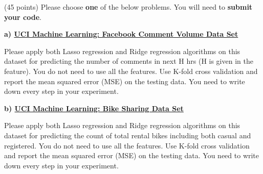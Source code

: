 \documentclass{exam}
\begin{document}
\begin{questions}
\newpage
{} (45 points) Please choose \textbf{one} of the below problems. You will need to \textbf{submit your code}.

{\bf a) \href{https://archive.ics.uci.edu/ml/datasets/Facebook+Comment+Volume+Dataset}{UCI Machine Learning: Facebook Comment Volume Data Set }}

Please apply both Lasso regression and Ridge regression algorithms on this dataset for predicting the number of comments in next H hrs (H is given in the feature).  You do not need to use all the features. Use K-fold cross validation and report the mean squared error (MSE) on the testing data. You need to write down every step in your experiment.

{\bf b) \href{https://archive.ics.uci.edu/ml/datasets/Bike+Sharing+Dataset}{UCI Machine Learning: Bike Sharing Data Set}}

Please apply both Lasso regression and Ridge regression algorithms on this dataset for predicting the count of total rental bikes including both casual and registered.  You do not need to use all the features. Use K-fold cross validation and report the mean squared error (MSE) on the testing data. You need to write down every step in your experiment.  \\


\end{questions}
\end{document}
